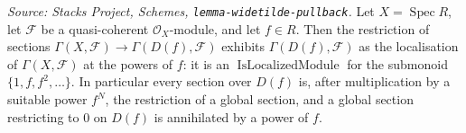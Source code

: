 \begin{lemma}
  \label{lem:qcoh_localized_sections}
  \textit{Source: Stacks Project, Schemes, \texttt{lemma-widetilde-pullback}.}
  Let \(X = \operatorname{Spec} R\), let \(\mathcal{F}\) be a quasi-coherent
  \(\mathcal{O}_X\)-module, and let \(f \in R\). Then the restriction of sections
  \(\Gamma(X, \mathcal{F}) \to \Gamma(D(f), \mathcal{F})\) exhibits
  \(\Gamma(D(f), \mathcal{F})\) as the localisation of \(\Gamma(X, \mathcal{F})\) at the
  powers of \(f\): it is an \(\operatorname{IsLocalizedModule}\) for the submonoid
  \(\{1, f, f^2, \ldots\}\). In particular every section over \(D(f)\) is, after
  multiplication by a suitable power \(f^N\), the restriction of a global section, and a
  global section restricting to \(0\) on \(D(f)\) is annihilated by a power of \(f\).
\end{lemma}
